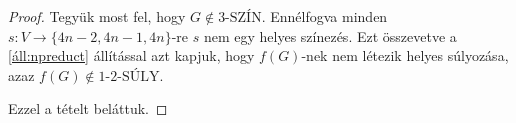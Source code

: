 \documentclass[12pt, a4paper]{report}
\theoremstyle{remark}
\theoremstyle{definition}
\begin{document}
\begin{proof}
Tegyük most fel, hogy $G \notin \textrm{3-SZÍN}$. Ennélfogva minden $s: V \rightarrow \lbrace 4n - 2, 4n - 1, 4n \rbrace$-re $s$ nem egy helyes színezés. Ezt összevetve a \ref{áll:npreduct} állítással azt kapjuk, hogy $f(G)$-nek nem létezik helyes súlyozása, azaz $f(G) \notin \textrm{1-2-SÚLY}$.

Ezzel a tételt beláttuk.
\end{proof}

\printbibliography
\end{document}
